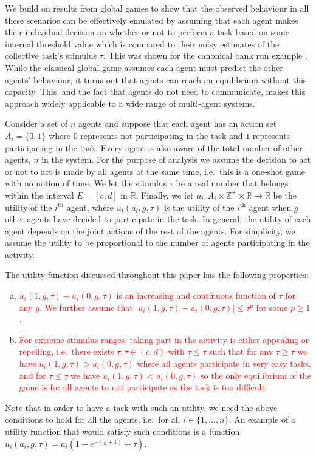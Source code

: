 \documentclass[smallextended]{svjour3}       %
\newcommand{\edit}[1]{\textcolor{red}{#1}}
\def\Z{\mathbb{Z}}    %
\def\R{\mathbb{R}}    %
\begin{document}
We build on results from global games \citep{Carlsson1993} to show that the observed behaviour in all these scenarios can be effectively emulated by assuming that each agent makes their individual decision on whether or not to perform a task based on some internal threshold value which is compared to their noisy estimates of the collective task's stimulus $\tau$. This was shown for the canonical bank run example \citep{Morris2000}. While the classical global game assumes each agent must predict the other agents' behaviour, it turns out that agents can reach an equilibrium without this capacity. This, and the fact that agents do not need to communicate, makes this approach widely applicable to a wide range of multi-agent systems.

Consider a set of $n$ agents and suppose that each agent has an action set $A_i=\{0,1\}$ where $0$ represents not participating in the task and $1$ represents participating in the task. Every agent is also aware of the total number of other agents, $n$ in the system. For the purpose of analysis we assume the decision to act or not to act is made by all agents at the same time, i.e.\ this is a one-shot game with no notion of time. We let the stimulus $\tau$ be a real number that belongs within the interval $E=[c,d]$ in $\R$. Finally, we let $u_i:A_i\times\Z^+\times \R\to \R$ be the utility of the $i^{\text{th}}$ agent, where $u_i(a_i,g,\tau)$ is the utility of the $i^{\text{th}}$ agent when $g$ other agents have decided to participate in the task. 
In general, the utility of each agent depends on the joint actions of the rest of the agents. For simplicity, we assume the utility to be proportional to the number of agents participating in the activity.

The utility function discussed throughout this paper has the following properties:
\begin{enumerate}[a.]
	\item \edit{$u_i(1,g,\tau)-u_i(0,g,\tau)$ is an increasing and continuous function of $\tau$ for any $g$. We further assume that $|u_i(1,g,\tau)-u_i(0,g,\tau)|\leq \tau^p$ for some $p\geq 1$.}
	\item \edit{For extreme stimulus ranges, taking part in the activity is either appealing or repelling, i.e.\ there exists $\underline{\tau},\bar{\tau}\in (c,d)$ with $\underline{\tau}\leq \bar{\tau}$ such that for any $\tau\geq \bar{\tau}$ we have $u_i(1,g,\tau)>u_i(0,g,\tau)$ where all agents participate in very easy tasks, and for $\tau\leq \underline{\tau}$ we have $u_i(1,g,\tau)<u_i(0,g,\tau)$ so the only equilibrium of the game is for all agents to not participate as the task is too difficult.}
\end{enumerate}
Note that in order to have a task with such an utility, we need the above conditions to hold for all the agents, i.e.\ for all $i\in\{1,\ldots,n\}$. An example of a utility function that would satisfy such conditions is a function $u_i(a_i,g,\tau)=a_i(1-e^{-(g+1)}+\tau)$. 
\end{document}

